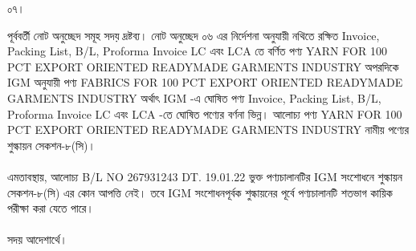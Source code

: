 \documentclass[12pt]{article}
\begin{document}
\noindent
\begin{minipage}[t]{0.05\linewidth}
০৭।
\end{minipage}
\begin{minipage}[t]{0.95\linewidth}
পূর্ববর্তী নোট অনুচ্ছেদ সমূহ সদয় দ্রষ্টব্য।
নোট অনুচ্ছেদ ০৬ এর নির্দেশনা অনুযায়ী নথিতে
রক্ষিত
Invoice, Packing List, B/L, Proforma Invoice LC
এবং
LCA
তে বর্ণিত পণ্য
YARN FOR 100 PCT EXPORT ORIENTED READYMADE GARMENTS INDUSTRY
অপরদিকে
IGM অনুযায়ী পণ্য
FABRICS FOR 100 PCT EXPORT ORIENTED READYMADE GARMENTS INDUSTRY
অর্থাৎ
IGM
-এ ঘোষিত পণ্য
Invoice, Packing List, B/L, Proforma Invoice LC
এবং
LCA
-তে ঘোষিত পণ্যের
বর্ণনা ভিন্ন।
আলোচ্য পণ্য
YARN FOR 100 PCT EXPORT ORIENTED READYMADE GARMENTS INDUSTRY
নামীয় পণ্যের শুল্কায়ন
সেকশন-৮(সি)।
\\
\\
এমতাবস্থায়, আলোচ্য
B/L NO 267931243
DT. 19.01.22
ভুক্ত পণ্যচালানটির IGM
সংশোধনে শুল্কায়ন সেকশন-৮(সি) এর
কোন আপত্তি নেই। তবে IGM সংশোধনপূর্বক শুল্কায়নের পূর্বে পণ্যচালানটি শতভাগ কায়িক পরীক্ষা করা যেতে পারে।
\\
\\
সদয় আদেশার্থে।
\end{minipage}
\end{document}
